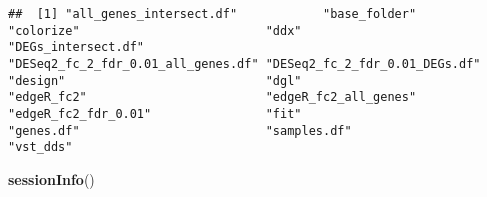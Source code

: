 \documentclass[]{book}
\newenvironment{Shaded}{\begin{snugshade}}{\end{snugshade}}
\newcommand{\KeywordTok}[1]{\textcolor[rgb]{0.13,0.29,0.53}{\textbf{#1}}}
\newcommand{\NormalTok}[1]{#1}
\begin{document}
\begin{verbatim}
##  [1] "all_genes_intersect.df"            "base_folder"                       "colorize"                          "ddx"                               "DEGs_intersect.df"                 "DESeq2_fc_2_fdr_0.01_all_genes.df" "DESeq2_fc_2_fdr_0.01_DEGs.df"      "design"                            "dgl"                               "edgeR_fc2"                         "edgeR_fc2_all_genes"               "edgeR_fc2_fdr_0.01"                "fit"                               "genes.df"                          "samples.df"                        "vst_dds"
\end{verbatim}

\begin{Shaded}
\begin{Highlighting}[]
\KeywordTok{sessionInfo}\NormalTok{()}
\end{Highlighting}
\end{Shaded}
\end{document}
